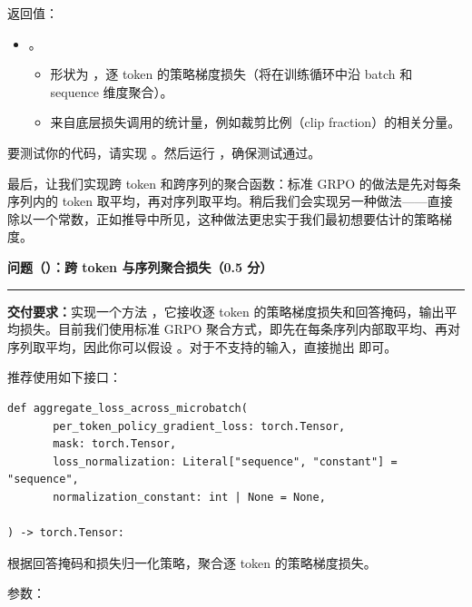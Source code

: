 返回值：

\begin{itemize}
  \item {}。
  \begin{itemize}
    \item {} 形状为 ，逐 token 的策略梯度损失（将在训练循环中沿 batch 和 sequence 维度聚合）。
    \item {} 来自底层损失调用的统计量，例如裁剪比例（clip fraction）的相关分量。
  \end{itemize}
\end{itemize}

要测试你的代码，请实现 。然后运行 ，确保测试通过。

最后，让我们实现跨 token 和跨序列的聚合函数：标准 GRPO 的做法是先对每条序列内的 token 取平均，再对序列取平均。稍后我们会实现另一种做法——直接除以一个常数，正如推导中所见，这种做法更忠实于我们最初想要估计的策略梯度。

\medskip
\noindent\textbf{问题（）：跨 token 与序列聚合损失（0.5 分）}
\par\nobreak\smallskip\hrule\nobreak\medskip

\textbf{交付要求：}实现一个方法 ，它接收逐 token 的策略梯度损失和回答掩码，输出平均损失。目前我们使用标准 GRPO 聚合方式，即先在每条序列内部取平均、再对序列取平均，因此你可以假设 。对于不支持的输入，直接抛出  即可。

推荐使用如下接口：

\begin{lstlisting}
def aggregate_loss_across_microbatch(
       per_token_policy_gradient_loss: torch.Tensor,
       mask: torch.Tensor,
       loss_normalization: Literal["sequence", "constant"] = "sequence",
       normalization_constant: int | None = None,

) -> torch.Tensor:
\end{lstlisting}

根据回答掩码和损失归一化策略，聚合逐 token 的策略梯度损失。

参数：

